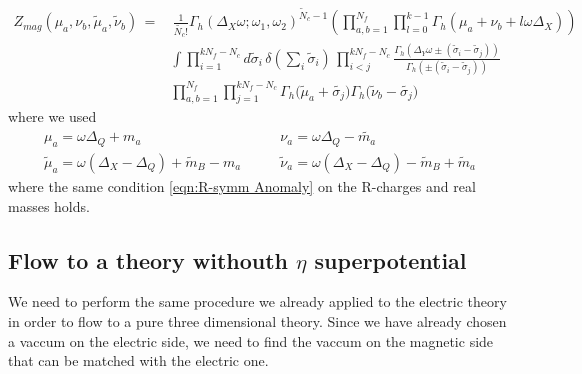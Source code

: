 \begin{equation}
\begin{aligned}
Z_{mag} ( \mu_a , \nu_b , \tilde{\mu}_a, \tilde{\nu}_b ) \,= & \, \frac{1}{\tilde{N_c}!}
 \Gamma_h ( \Delta_X \omega ; \omega_1 , \omega_2)^{ \tilde N_c-1}
\left( \prod_{a,b=1}^{N_f}   \prod_{l=0}^{k-1} \Gamma_h \left( \mu_a+  \nu_b + l \omega \Delta_X \right)  \right) \\
&\int
\prod_{i=1}^{ kN_f - N_c} d \tilde{\sigma}_i \, \delta( \sum_i \tilde{\sigma}_i) \,
 \prod_{i<j}^{kN_f - N_c} \frac{ \Gamma_h( \Delta_Y \omega \pm (\tilde{\sigma}_i - \tilde{\sigma}_j)) }{ \Gamma_h ( \pm (\tilde{\sigma}_i - \tilde{\sigma}_j) )} \\
 &  \prod_{a,b=1}^{N_f} \prod_{j=1}^{k N_f - N_c} \Gamma_h \big( \tilde{ \mu}_a + \tilde{\sigma_j} \big) \Gamma_h \big( \tilde{\nu}_b - \tilde{\sigma_j} \big)
\end{aligned}
\end{equation}
where we used
\begin{equation}
\begin{aligned}
 \mu_a = \omega \Delta_Q + m_a  &\qquad \nu_a = \omega \Delta_Q - \tilde{m_a}\\
 \tilde \mu_a = \omega ( \Delta_X - \Delta_Q ) + \tilde{m}_B - m_a  &  \qquad \tilde \nu_a = \omega ( \Delta_X - \Delta_Q ) - \tilde{m}_B + \tilde m_a
\end{aligned}
\end{equation}
where the same condition \eqref{eqn:R-symm Anomaly} on the R-charges and real masses  holds.\\

\subsection{Flow to a theory withouth $\eta$ superpotential}
We need to perform the same procedure we already applied to the electric theory in order to flow to a pure three dimensional theory.
Since we have already chosen a vaccum on the electric side, we need to find the vaccum on the magnetic side that can be matched with the electric one.\\



